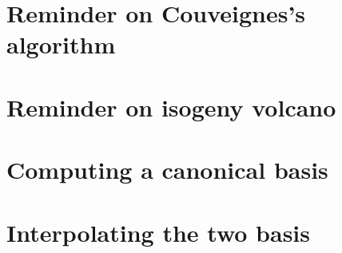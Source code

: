 \documentclass[10pt,a4paper]{article}
\author{Luca DeFeo,Cyril Hugounenq,}
\theoremstyle{plain}
\theoremstyle{definition}
\theoremstyle{definition}
\theoremstyle{definition}
\theoremstyle{definition}
\theoremstyle{remark}
\theoremstyle{remark}
\begin{document}
\section{Reminder on Couveignes's algorithm}


\section{Reminder on isogeny volcano}

\section{Computing a canonical basis}

\section{Interpolating the two basis}

\end{document}

